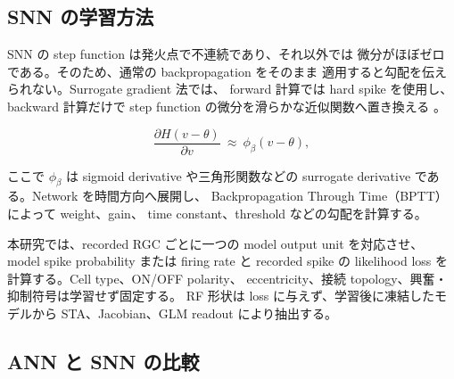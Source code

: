 \documentclass[a4paper,10pt,twocolumn,uplatex,dvipdfmx]{jsarticle}
\begin{document}
\subsection{SNN の学習方法}

SNN の step function は発火点で不連続であり、それ以外では
微分がほぼゼロである。そのため、通常の backpropagation をそのまま
適用すると勾配を伝えられない。Surrogate gradient 法では、
forward 計算では hard spike を使用し、backward 計算だけで
step function の微分を滑らかな近似関数へ置き換える
\cite{neftci2019,eshraghian2023}。

\begin{equation}
  \frac{\partial H(v-\theta)}{\partial v}
  \ \approx\ \phi_{\beta}(v-\theta),
\end{equation}

ここで $\phi_{\beta}$ は sigmoid derivative や三角形関数などの
surrogate derivative である。Network を時間方向へ展開し、
Backpropagation Through Time（BPTT）によって weight、gain、
time constant、threshold などの勾配を計算する。

本研究では、recorded RGC ごとに一つの model output unit を対応させ、
model spike probability または firing rate と recorded spike の
likelihood loss を計算する。Cell type、ON/OFF polarity、
eccentricity、接続 topology、興奮・抑制符号は学習せず固定する。
RF 形状は loss に与えず、学習後に凍結したモデルから
STA、Jacobian、GLM readout により抽出する。

\subsection{ANN と SNN の比較}
\end{document}
